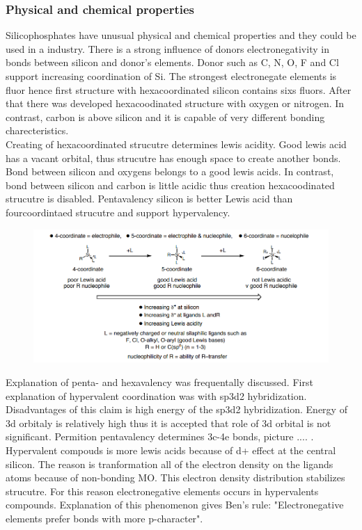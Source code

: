 \documentclass[
  digital, %
  table,   %
  lof,     %
  lot,     %
]{fithesis3}
\begin{document}
\subsubsection{Physical and chemical properties}
Silicophosphates have unusual physical and chemical properties and they could be used in a industry. There is a strong influence of donors electronegativity in bonds between silicon and donor's elements.  Donor such as C, N, O, F and Cl support increasing coordination of Si. The strongest electronegate elements is fluor hence first structure with hexacoordinated silicon contains sixs fluors. After that there was developed hexacoodinated structure with oxygen or nitrogen. In contrast, carbon is above silicon and it is capable of very different bonding charecteristics. \\
Creating of hexacoordinated strucutre determines lewis acidity. Good lewis acid has a vacant orbital, thus strucutre has enough space to create another bonds. Bond between silicon and oxygens belongs to a good lewis acids. In contrast, bond between silicon and carbon is little acidic thus creation hexacoodinated strucutre is disabled. Pentavalency silicon is better Lewis acid than fourcoordintaed strucutre and support hypervalency.\cite{Wagler2014}\\

\begin{figure}[h!]
\caption{\cite{hypervalentsiliconmacmillangroup2005}}
  \center
  \includegraphics[width=12cm]{schema_silicophosphates.png}
  \label{schema_silicon_coordinate}
  \end{figure}


 Explanation of penta- and hexavalency was frequentally discussed. First explanation of hypervalent coordination was with sp3d2 hybridization. Disadvantages of this claim is high energy of the sp3d2 hybridization. Energy of 3d orbitaly is relatively high thus it is accepted that role of 3d orbital is not significant. Permition pentavalency determines 3c-4e bonds, picture .... . Hypervalent compouds is more lewis acids because of d+ effect at the central silicon. The reason is tranformation all of the electron density on the ligands atoms because of non-bonding MO. This electron density distribution stabilizes strucutre. For this reason electronegative elements occurs in hypervalents compounds. Explanation of this phenomenon gives Ben's rule: "Electronegative elements prefer bonds with more p-character".\cite{hypervalentsiliconmacmillangroup2005} \\
\end{document}
